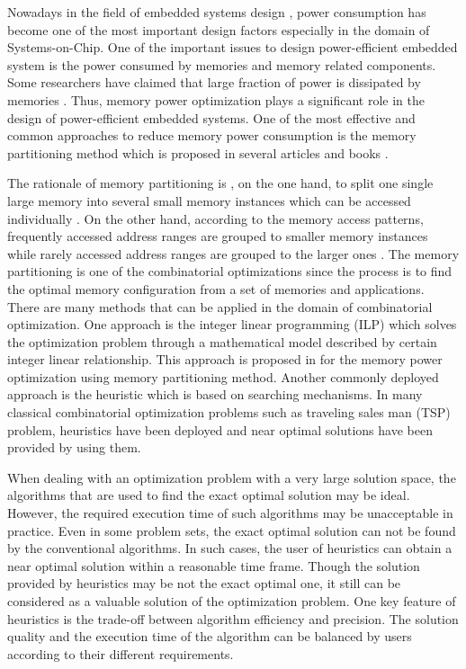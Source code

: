 \label{chap:introduction}
	Nowadays in the field of embedded systems design , power consumption has become one of the most important design factors especially in the domain of Systems-on-Chip. One of the important issues to design power-efficient embedded system is the power consumed by memories and memory related components. Some researchers have claimed that large fraction of power is dissipated by memories \cite{4415607, 876761}. Thus, memory power optimization plays a significant role in the design of power-efficient embedded systems.
	One of the most effective and common approaches to reduce memory power consumption is the memory partitioning method which is proposed in several articles and books \cite[p.43]{876761, Hiser:2005:EAP:1088093, macii2002memory}.
	
	The rationale of memory partitioning is , on the one hand, to split one single large memory into several small memory instances which can be accessed individually \cite{4415607}. On the other hand, according to the memory access patterns, frequently accessed address ranges are grouped to smaller memory instances while rarely accessed address ranges are grouped to the larger ones \cite{Strobel2016}.
	The memory partitioning is one of the combinatorial optimizations since the process is to find the optimal memory configuration from a set of memories and applications. There are many methods that can be applied in the domain of combinatorial optimization. One approach is the integer linear programming (ILP) which solves the optimization problem through a mathematical model described by certain integer linear relationship. This approach is proposed in \cite{Strobel2016} for the memory power optimization using memory partitioning method.
	Another commonly deployed approach is the heuristic which is based on searching mechanisms. In many classical combinatorial optimization
	problems such as traveling sales man (TSP) problem, heuristics have been deployed and near optimal solutions have been provided by using them.
	
	When dealing with an optimization problem with a very large solution space, the algorithms that are used to find the exact optimal solution may be ideal. However, the required execution time of such algorithms may be unacceptable in practice. Even in some problem sets, the exact optimal solution can not be found by the conventional algorithms. In such cases, the user of heuristics can obtain a near optimal solution within a reasonable time frame. Though the solution provided by heuristics may be not the exact optimal one, it still can be considered as a valuable solution of the optimization problem. One key feature of heuristics is the trade-off between algorithm efficiency and precision. The solution quality and the execution time of the algorithm can be balanced by users according to their different requirements.
	
